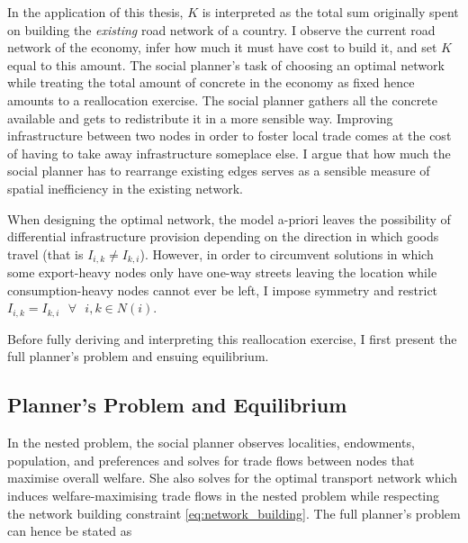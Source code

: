 \documentclass[11pt, oneside]{article}   	%
\begin{document}
In the application of this thesis, $K$ is interpreted as the total sum originally spent on building the \emph{existing} road network of a country. I observe the current road network of the economy, infer how much it must have cost to build it, and set $K$ equal to this amount. The social planner's task of choosing an optimal network while treating the total amount of concrete in the economy as fixed hence amounts to a reallocation exercise. The social planner gathers all the concrete available and gets to redistribute it in a more sensible way. Improving infrastructure between two nodes in order to foster local trade comes at the cost of having to take away infrastructure someplace else. I argue that how much the social planner has to rearrange existing edges serves as a sensible measure of spatial inefficiency in the existing network.

When designing the optimal network, the model a-priori leaves the possibility of differential infrastructure provision depending on the direction in which goods travel (that is $I_{i,k} \neq I_{k,i}$). However, in order to circumvent solutions in which some export-heavy nodes only have one-way streets leaving the location while consumption-heavy nodes cannot ever be left, I impose symmetry and restrict $I_{i,k} = I_{k,i} \textrm{ } \forall \textrm{ } i,k\in N(i)$.

Before fully deriving and interpreting this reallocation exercise, I first present the full planner's problem and ensuing equilibrium.

\subsection{Planner's Problem and Equilibrium}
In the nested problem, the social planner observes localities, endowments, population, and preferences and solves for trade flows between nodes that maximise overall welfare. She also solves for the optimal transport network which induces welfare-maximising trade flows in the nested problem while respecting the network building constraint \eqref{eq:network_building}. The full planner's problem can hence be stated as
\end{document}
